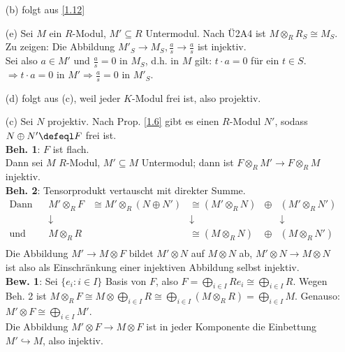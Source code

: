 \begin{Bew}
\begin{enumerate}
\item[(b)] folgt aus \ref{1.12}
\item[(e)] Sei $M$ ein $R$-Modul, $M'\subseteq R$ Untermodul.
Nach \"U2A4 ist $M\otimes_R R_S \cong M_S$.\\
Zu zeigen: Die Abbildung $M'_S\to M_S, \frac{a}{s}\to \frac{a}{s}$ ist injektiv. \\
Sei also $a\in M'$ und $\frac{a}{s}=0$ in $M_S$, d.h. in $M$ gilt: $t\cdot a=0$ f\"ur ein $t\in S$.
$\Rightarrow t\cdot a = 0$ in $M'\Rightarrow \frac{a}{s}=0$ in $M'_S$.
\item[(d)] folgt aus (c), weil jeder $K$-Modul frei ist, also projektiv.
\item[(c)] Sei $N$ projektiv. Nach Prop. \ref{1.6} gibt es einen $R$-Modul
$N'$, sodass $N \oplus N'\defeql F$ frei ist.\\ \textbf{Beh. 1}: $F$ ist flach.\\
Dann sei $M$ $R$-Modul, $M'\subseteq M$ Untermodul; dann ist $F\otimes_R M'\to F\otimes_R M$ injektiv.\\
\textbf{Beh. 2}: Tensorprodukt vertauscht mit direkter Summe.\\
$\begin{array}{lccccc}
\textrm{Dann ist }  &   M'\otimes_R F & \cong M'\otimes_R(N\oplus N')   &\cong (M'\otimes_R N)&\oplus &(M'\otimes_R N') \\
                    &   \downarrow &                                 &\downarrow               &   &\downarrow\\
  \textrm{und}       &   M\otimes_R R &                               &\cong (M\otimes_R N)&\oplus &(M\otimes_R N')\\
\end{array}$
Die Abbildung $M'\to M\otimes F$ bildet $M'\otimes N$ auf $M\otimes N$ ab, 
$M'\otimes N\to M\otimes N$ ist also als Einschr\"ankung einer injektiven Abbildung selbst injektiv.\\
\textbf{Bew. 1}: Sei $\{e_i:i\in I\}$ Basis  von $F$, also $F=\bigoplus_{i\in I} R e_i\cong \bigoplus_{i\in I} R$.
Wegen Beh. 2 ist $M\otimes_R F\cong M\otimes \bigoplus_{i\in I}R\cong \bigoplus_{i\in I}(M\otimes_R R)=\bigoplus_{i\in I}M$.
Genauso: $M' \otimes F\cong \bigoplus_{i\in I}M'$.\\
Die Abbildung $M'\otimes F\to M\otimes F$ ist in jeder Komponente die Einbettung $M'\hookrightarrow M$, also injektiv.\\

\end{enumerate}
\end{Bew}
